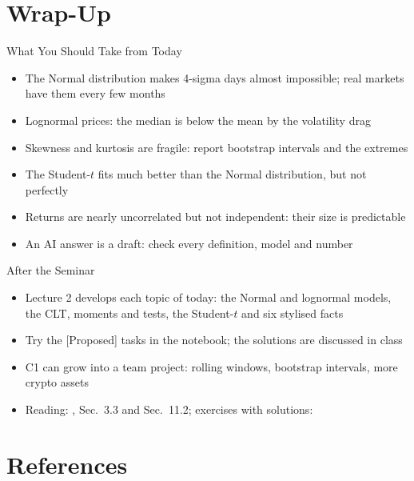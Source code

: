 \section{Wrap-Up}

\begin{frame}{What You Should Take from Today}
\itemsize{\small}
\begin{itemize}
    \item The Normal distribution makes 4-sigma days almost impossible; real markets have them every few months
    \item Lognormal prices: the median is below the mean by the volatility drag
    \item Skewness and kurtosis are fragile: report bootstrap intervals and the extremes
    \item The Student-$t$ fits much better than the Normal distribution, but not perfectly
    \item Returns are nearly uncorrelated but not independent: their size is predictable
    \item An AI answer is a draft: check every definition, model and number
\end{itemize}
\end{frame}

\begin{frame}{After the Seminar}
\itemsize{\small}
\begin{itemize}
    \item Lecture 2 develops each topic of today: the Normal and lognormal models, the CLT, moments and tests, the Student-$t$ and six stylised facts
    \item Try the [Proposed] tasks in the notebook; the solutions are discussed in class
    \item C1 can grow into a team project: rolling windows, bootstrap intervals, more crypto assets
    \item Reading: , Sec.~3.3 and Sec.~11.2; exercises with solutions: 
\end{itemize}
\end{frame}


\section{References}

